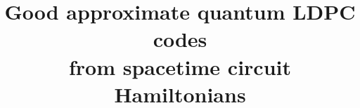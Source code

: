\documentclass[11pt,letterpaper]{article}
\theoremstyle{definition}
\theoremstyle{remark}
\numberwithin{equation}{section}
\theoremstyle{definition}
\begin{document}
\title{Good approximate quantum LDPC codes\\ from spacetime circuit Hamiltonians}%
\makeatletter
\renewcommand\@date{{%
  \vspace{-\baselineskip}%
  \large\centering
  \begin{tabular}{@{}c@{}}
     Thomas C. Bohdanowicz \\
    \footnotesize Caltech \\ \footnotesize \href{mailto:thom@caltech.edu}{thom@caltech.edu}
  \end{tabular}%
  \hspace{1em}
  \begin{tabular}{@{}c@{}}
      Elizabeth Crosson\\
    \footnotesize University of New Mexico \\ \footnotesize \href{mailto:crosson@unm.edu}{crosson@unm.edu}
  \end{tabular}
  \hspace{1em}
  \begin{tabular}{@{}c@{}}
     Chinmay Nirkhe \\
     \footnotesize UC Berkeley \\
    \footnotesize \href{nirkhe@cs.berkeley.edu}{nirkhe@cs.berkeley.edu}
  \end{tabular}
    \hspace{1em}
  \begin{tabular}{@{}c@{}}
     Henry Yuen \\
     \footnotesize University of Toronto \\
    \footnotesize \href{mailto:hyuen@cs.toronto.edu}{hyuen@cs.toronto.edu}
  \end{tabular}

}}
\makeatother
\maketitle {}
\vspace{-10pt}
\end{document}
